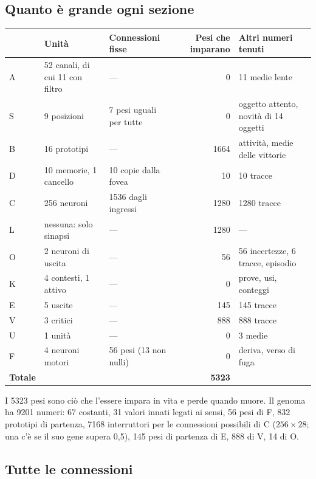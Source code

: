 \documentclass[11pt,a4paper]{article}
\begin{document}
\subsection{Quanto è grande ogni sezione}

\begin{center}
\small
\begin{tabularx}{\textwidth}{@{}lL{3.2cm}L{3.0cm}rY@{}}
\toprule
& \textbf{Unità} & \textbf{Connessioni fisse} & \textbf{Pesi che imparano} & \textbf{Altri numeri tenuti} \\
\midrule
A & 52 canali, di cui 11 con filtro & --- & 0 & 11 medie lente \\
S & 9 posizioni & 7 pesi uguali per tutte & 0 & oggetto attento, novità di 14 oggetti \\
B & 16 prototipi & --- & 1664 & attività, medie delle vittorie \\
D & 10 memorie, 1 cancello & 10 copie dalla fovea & 10 & 10 tracce \\
C & 256 neuroni & 1536 dagli ingressi & 1280 & 1280 tracce \\
L & nessuna: solo sinapsi & --- & 1280 & --- \\
O & 2 neuroni di uscita & --- & 56 & 56 incertezze, 6 tracce, episodio \\
K & 4 contesti, 1 attivo & --- & 0 & prove, usi, conteggi \\
E & 5 uscite & --- & 145 & 145 tracce \\
V & 3 critici & --- & 888 & 888 tracce \\
U & 1 unità & --- & 0 & 3 medie \\
F & 4 neuroni motori & 56 pesi (13 non nulli) & 0 & deriva, verso di fuga \\
\midrule
\textbf{Totale} & & & \textbf{5323} & \\
\bottomrule
\end{tabularx}
\end{center}

I 5323 pesi sono ciò che l'essere impara in vita e perde quando muore. Il genoma ha 9201
numeri: 67 costanti, 31 valori innati legati ai sensi, 56 pesi di F, 832 prototipi di partenza,
7168 interruttori per le connessioni possibili di C ($256\times28$; una c'è se il suo gene
supera 0,5), 145 pesi di partenza di E, 888 di V, 14 di O.

\subsection{Tutte le connessioni}
\end{document}
